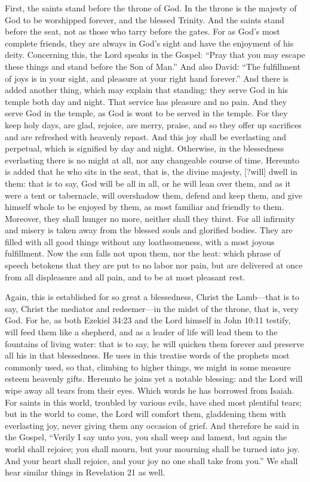 First, the saints stand before the throne of God. In the throne is the majesty of God to be worshipped forever, and the blessed Trinity. And the saints stand before the seat, not as those who tarry before the gates. For as God’s most complete friends, they are always in God’s sight and have the enjoyment of his deity. Concerning this, the Lord speaks in the Gospel: “Pray that you may escape these things and stand before the Son of Man.” And also David: “The fulfillment of joys is in your sight, and pleasure at your right hand forever.” And there is added another thing, which may explain that standing: they serve God in his temple both day and night. That service has pleasure and no pain. And they serve God in the temple, as God is wont to be served in the temple. For they keep holy days, are glad, rejoice, are merry, praise, and so they offer up sacrifices and are refreshed with heavenly repast. And this joy shall be everlasting and perpetual, which is signified by day and night. Otherwise, in the blessedness everlasting there is no might at all, nor any changeable course of time. Hereunto is added that he who sits in the seat, that is, the divine majesty, [?will] dwell in them: that is to say, God will be all in all, or he will lean over them, and as it were a tent or tabernacle, will overshadow them, defend and keep them, and give himself whole to be enjoyed by them, as most familiar and friendly to them. Moreover, they shall hunger no more, neither shall they thirst. For all infirmity and misery is taken away from the blessed souls and glorified bodies. They are filled with all good things without any loathsomeness, with a most joyous fulfillment. Now the sun falls not upon them, nor the heat: which phrase of speech betokens that they are put to no labor nor pain, but are delivered at once from all displeasure and all pain, and to be at most pleasant rest.

Again, this is established for so great a blessedness, Christ the Lamb—that is to say, Christ the mediator and redeemer—in the midst of the throne, that is, very God. For he, as both Ezekiel 34:23 and the Lord himself in John 10:11 testify, will feed them like a shepherd, and as a leader of life will lead them to the fountains of living water: that is to say, he will quicken them forever and preserve all his in that blessedness. He uses in this treatise words of the prophets most commonly used, so that, climbing to higher things, we might in some measure esteem heavenly gifts. Hereunto he joins yet a notable blessing: and the Lord will wipe away all tears from their eyes. Which words he has borrowed from Isaiah. For saints in this world, troubled by various evils, have shed most plentiful tears; but in the world to come, the Lord will comfort them, gladdening them with everlasting joy, never giving them any occasion of grief. And therefore he said in the Gospel, “Verily I say unto you, you shall weep and lament, but again the world shall rejoice; you shall mourn, but your mourning shall be turned into joy. And your heart shall rejoice, and your joy no one shall take from you.” We shall hear similar things in Revelation 21 as well.


